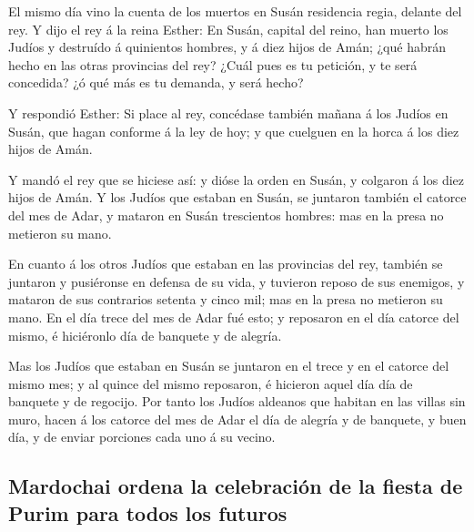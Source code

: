  El mismo día vino la cuenta de los muertos en Susán
residencia regia, delante del rey.  Y dijo el rey á la
reina Esther: En Susán, capital del reino, han muerto los Judíos y
destruído á quinientos hombres, y á diez hijos de Amán; ¿qué habrán
hecho en las otras provincias del rey? ¿Cuál pues es tu petición, y te
será concedida? ¿ó qué más es tu demanda, y será hecho?

 Y respondió Esther: Si place al rey, concédase también
mañana á los Judíos en Susán, que hagan conforme á la ley de hoy; y que
cuelguen en la horca á los diez hijos de Amán.

 Y mandó el rey que se hiciese así: y dióse la orden en
Susán, y colgaron á los diez hijos de Amán.  Y los Judíos
que estaban en Susán, se juntaron también el catorce del mes de Adar, y
mataron en Susán trescientos hombres: mas en la presa no metieron su
mano.

 En cuanto á los otros Judíos que estaban en las
provincias del rey, también se juntaron y pusiéronse en defensa de su
vida, y tuvieron reposo de sus enemigos, y mataron de sus contrarios
setenta y cinco mil; mas en la presa no metieron su mano.
 En el día trece del mes de Adar fué esto; y reposaron en
el día catorce del mismo, é hiciéronlo día de banquete y de alegría.

 Mas los Judíos que estaban en Susán se juntaron en el
trece y en el catorce del mismo mes; y al quince del mismo reposaron, é
hicieron aquel día día de banquete y de regocijo.  Por
tanto los Judíos aldeanos que habitan en las villas sin muro, hacen á
los catorce del mes de Adar el día de alegría y de banquete, y buen día,
y de enviar porciones cada uno á su vecino.

\hypertarget{mardochai-ordena-la-celebraciuxf3n-de-la-fiesta-de-purim-para-todos-los-futuros}{%
\subsection{Mardochai ordena la celebración de la fiesta de Purim para
todos los
futuros}\label{mardochai-ordena-la-celebraciuxf3n-de-la-fiesta-de-purim-para-todos-los-futuros}}

